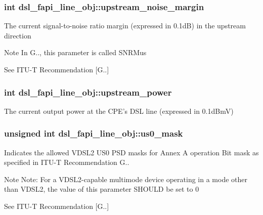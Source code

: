 \hypertarget{structdsl__fapi__line__obj_aa16c906c255a409649f2b710d359d6b6}{
\subsubsection[{upstream\-\_\-noise\-\_\-margin}]{\setlength{\rightskip}{0pt plus 5cm}int dsl\-\_\-fapi\-\_\-line\-\_\-obj\-::upstream\-\_\-noise\-\_\-margin}}\label{structdsl__fapi__line__obj_aa16c906c255a409649f2b710d359d6b6}
The current signal-\/to-\/noise ratio margin (expressed in 0.\-1d\-B) in the upstream direction \begin{DoxyNote}{Note}
In G.., this parameter is called S\-N\-R\-Mus 

See I\-T\-U-\/\-T Recommendation \mbox{[}G..\mbox{]} 
\end{DoxyNote}
\hypertarget{structdsl__fapi__line__obj_a2bea256ab435b5989d286358c95ca2af}{
\subsubsection[{upstream\-\_\-power}]{\setlength{\rightskip}{0pt plus 5cm}int dsl\-\_\-fapi\-\_\-line\-\_\-obj\-::upstream\-\_\-power}}\label{structdsl__fapi__line__obj_a2bea256ab435b5989d286358c95ca2af}
The current output power at the C\-P\-E's D\-S\-L line (expressed in 0.\-1d\-Bm\-V) \hypertarget{structdsl__fapi__line__obj_a7dc65fd86cd6cf3f31266f8ef3000e72}{
\subsubsection[{us0\-\_\-mask}]{\setlength{\rightskip}{0pt plus 5cm}unsigned int dsl\-\_\-fapi\-\_\-line\-\_\-obj\-::us0\-\_\-mask}}\label{structdsl__fapi__line__obj_a7dc65fd86cd6cf3f31266f8ef3000e72}
Indicates the allowed V\-D\-S\-L2 U\-S0 P\-S\-D masks for Annex A operation Bit mask as specified in I\-T\-U-\/\-T Recommendation G.. \begin{DoxyNote}{Note}
Note\-: For a V\-D\-S\-L2-\/capable multimode device operating in a mode other than V\-D\-S\-L2, the value of this parameter S\-H\-O\-U\-L\-D be set to 0 

See I\-T\-U-\/\-T Recommendation \mbox{[}G..\mbox{]} 
\end{DoxyNote}
